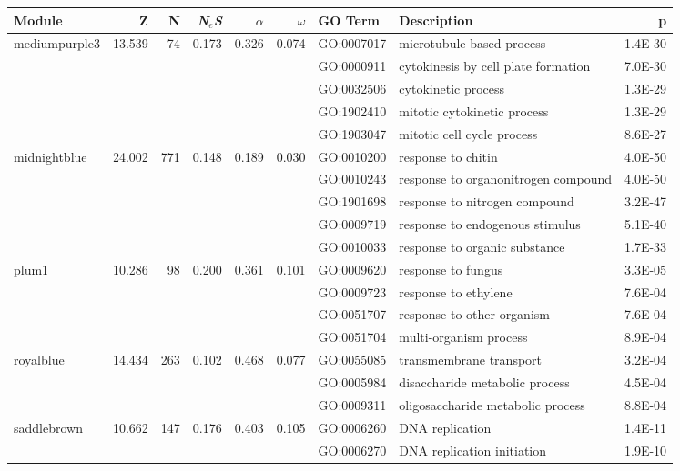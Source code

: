 \documentclass{ut-thesis}
\begin{document}
\begin{landscape}
\begin{table}[ht]
\centering
\begin{tabular}{|l|rrrrrlP{5cm}r|}
  \hline
Module & Z & N & \textit{N$_{e}$S}& $\alpha$ & $\omega$ & GO Term & Description & p \\ 
  \hline

 mediumpurple3 & 13.539 & 74 & 0.173 & 0.326 & 0.074 & GO:0007017 & microtubule-based process & 1.4E-30 \\ 
   &  &  &  &  &  & GO:0000911 & cytokinesis by cell plate formation & 7.0E-30 \\ 
   &  &  &  &  &  & GO:0032506 & cytokinetic process & 1.3E-29 \\ 
   &  &  &  &  &  & GO:1902410 & mitotic cytokinetic process & 1.3E-29 \\ 
   &  &  &  &  &  & GO:1903047 & mitotic cell cycle process & 8.6E-27 \\ 
\hline
  midnightblue & 24.002 & 771 & 0.148 & 0.189 & 0.030 & GO:0010200 & response to chitin & 4.0E-50 \\ 
   &  &  &  &  &  & GO:0010243 & response to organonitrogen compound & 4.0E-50 \\ 
   &  &  &  &  &  & GO:1901698 & response to nitrogen compound & 3.2E-47 \\ 
   &  &  &  &  &  & GO:0009719 & response to endogenous stimulus & 5.1E-40 \\ 
   &  &  &  &  &  & GO:0010033 & response to organic substance & 1.7E-33 \\ 
\hline 
 plum1 & 10.286 & 98 & 0.200 & 0.361 & 0.101 & GO:0009620 & response to fungus & 3.3E-05 \\ 
   &  &  &  &  &  & GO:0009723 & response to ethylene & 7.6E-04 \\ 
   &  &  &  &  &  & GO:0051707 & response to other organism & 7.6E-04 \\ 
   &  &  &  &  &  & GO:0051704 & multi-organism process & 8.9E-04 \\ 
\hline  
royalblue & 14.434 & 263 & 0.102 & 0.468 & 0.077 & GO:0055085 & transmembrane transport & 3.2E-04 \\ 
   &  &  &  &  &  & GO:0005984 & disaccharide metabolic process & 4.5E-04 \\ 
   &  &  &  &  &  & GO:0009311 & oligosaccharide metabolic process & 8.8E-04 \\ 
\hline 
 saddlebrown & 10.662 & 147 & 0.176 & 0.403 & 0.105 & GO:0006260 & DNA replication & 1.4E-11 \\ 
   &  &  &  &  &  & GO:0006270 & DNA replication initiation & 1.9E-10 \\ 

\end{tabular}
\end{table}
\end{landscape}
\end{document}
